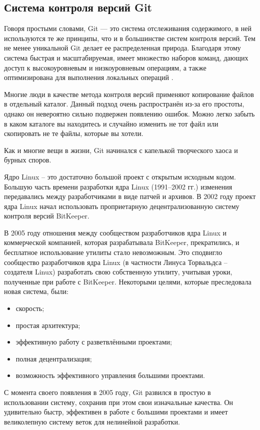 \subsection{Система контроля версий Git}

Говоря простыми словами, Git — это система отслеживания содержимого, в ней используются те же принципы, что и в большинстве систем контроля версий. Тем не менее уникальной Git делает ее распределенная природа. Благодаря этому система быстрая и масштабируемая, имеет множество наборов команд, дающих доступ к высокоуровневым и низкоуровневым операциям, а также оптимизирована для выполнения локальных операций \cite{Git}.

Многие люди в качестве метода контроля версий применяют копирование файлов в
отдельный каталог. Данный подход очень распространён из-за его простоты, однако он невероятно сильно подвержен появлению ошибок. Можно легко забыть в каком каталоге вы находитесь и случайно изменить не тот файл или скопировать не те файлы, которые вы хотели.

Как и многие вещи в жизни, Git начинался с капелькой творческого хаоса и бурных споров.

Ядро Linux -- это достаточно большой проект с открытым исходным кодом. Большую часть времени разработки ядра Linux (1991–2002 гг.) изменения передавались между разработчиками в виде патчей и архивов. В 2002 году проект ядра Linux начал использовать проприетарную децентрализованную систему контроля версий BitKeeper.

В 2005 году отношения между сообществом разработчиков ядра Linux и коммерческой компанией, которая разрабатывала BitKeeper, прекратились, и бесплатное использование утилиты стало невозможным. Это сподвигло сообщество разработчиков ядра Linux (в частности Линуса Торвальдса -- создателя Linux) разработать свою собственную утилиту, учитывая уроки, полученные при работе с BitKeeper. Некоторыми целями, которые преследовала новая система, были:
\begin{itemize}
	\item скорость;
	\item простая архитектура;
	\item эффективную работу с разветвлёнными проектами;
	\item полная децентрализация;
	\item возможность эффективного управления большими проектами.
\end{itemize}

С момента своего появления в 2005 году, Git развился в простую в использовании систему, сохранив при этом свои изначальные качества. Он удивительно быстр, эффективен в работе с большими проектами и имеет великолепную систему веток для нелинейной разработки.

